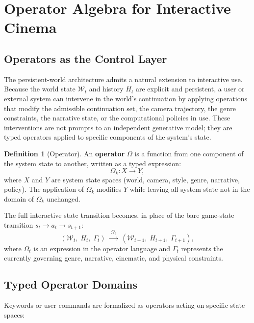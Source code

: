 \documentclass[12pt,a4paper]{article}
\theoremstyle{plain}
\theoremstyle{definition}
\newtheorem{definition}[theorem]{Definition}
\theoremstyle{remark}
\begin{document}
\section{Operator Algebra for Interactive Cinema}
\label{sec:operators}

\subsection{Operators as the Control Layer}

The persistent-world architecture admits a natural extension to interactive use. Because the world state $\mathcal{W}_t$ and history $H_t$ are explicit and persistent, a user or external system can intervene in the world's continuation by applying operations that modify the admissible continuation set, the camera trajectory, the genre constraints, the narrative state, or the computational policies in use. These interventions are not prompts to an independent generative model; they are typed operators applied to specific components of the system's state.

\begin{definition}[Operator]
An \textbf{operator} $\Omega$ is a function from one component of the system state to another, written as a typed expression:
\[
\Omega_k : X \to Y,
\]
where $X$ and $Y$ are system state spaces (world, camera, style, genre, narrative, policy). The application of $\Omega_k$ modifies $Y$ while leaving all system state not in the domain of $\Omega_k$ unchanged.
\end{definition}

The full interactive state transition becomes, in place of the bare game-state transition $s_t \to a_t \to s_{t+1}$:
\[
(\mathcal{W}_t,\; H_t,\; \Gamma_t)
\;\xrightarrow{\;\Omega_t\;}
\;(\mathcal{W}_{t+1},\; H_{t+1},\; \Gamma_{t+1}),
\]
where $\Omega_t$ is an expression in the operator language and $\Gamma_t$ represents the currently governing genre, narrative, cinematic, and physical constraints.

\subsection{Typed Operator Domains}

Keywords or user commands are formalized as operators acting on specific state spaces:
\end{document}
